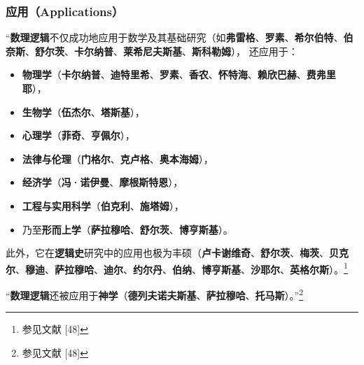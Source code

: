 \subsubsection{应用（Applications）}

“\textbf{数理逻辑}不仅成功地应用于数学及其基础研究（如\textbf{弗雷格}、\textbf{罗素}、\textbf{希尔伯特}、\textbf{伯奈斯}、\textbf{舒尔茨}、\textbf{卡尔纳普}、\textbf{莱希尼夫斯基}、\textbf{斯科勒姆}），  
还应用于：
\begin{itemize}
  \item \textbf{物理学}（\textbf{卡尔纳普}、\textbf{迪特里希}、\textbf{罗素}、\textbf{香农}、\textbf{怀特海}、\textbf{赖欣巴赫}、\textbf{费弗里耶}），
  \item \textbf{生物学}（\textbf{伍杰尔}、\textbf{塔斯基}），
  \item \textbf{心理学}（\textbf{菲奇}、\textbf{亨佩尔}），
  \item \textbf{法律与伦理}（\textbf{门格尔}、\textbf{克卢格}、\textbf{奥本海姆}），
  \item \textbf{经济学}（\textbf{冯·诺伊曼}、\textbf{摩根斯特恩}），
  \item \textbf{工程与实用科学}（\textbf{伯克利}、\textbf{施塔姆}），
  \item 乃至\textbf{形而上学}（\textbf{萨拉穆哈}、\textbf{舒尔茨}、\textbf{博亨斯基}）。
\end{itemize}

此外，它在\textbf{逻辑史}研究中的应用也极为丰硕（\textbf{卢卡谢维奇}、\textbf{舒尔茨}、\textbf{梅茨}、\textbf{贝克尔}、\textbf{穆迪}、\textbf{萨拉穆哈}、\textbf{迪尔}、\textbf{约尔丹}、\textbf{伯纳}、\textbf{博亨斯基}、\textbf{沙耶尔}、\textbf{英格尔斯}）。\footnote{参见文献 [48]}

“\textbf{数理逻辑}还被应用于\textbf{神学}（\textbf{德列夫诺夫斯基}、\textbf{萨拉穆哈}、\textbf{托马斯}）。”\footnote{参见文献 [48]}

